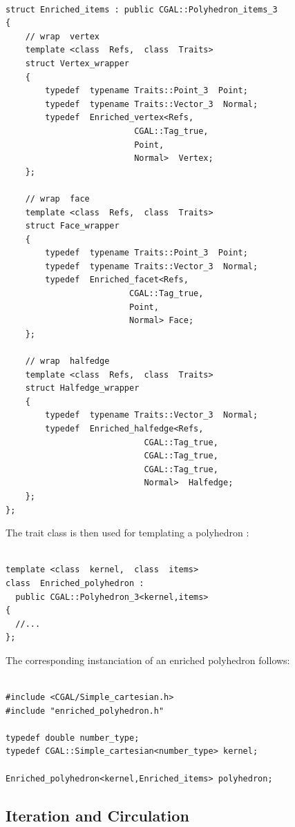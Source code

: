 \documentclass[letter,twoside,10pt]{article}
\begin{document}
{ \scriptsize
\begin{verbatim}

struct Enriched_items : public CGAL::Polyhedron_items_3
{
    // wrap  vertex
    template <class  Refs,  class  Traits>
    struct Vertex_wrapper
    {
        typedef  typename Traits::Point_3  Point;
        typedef  typename Traits::Vector_3  Normal;
        typedef  Enriched_vertex<Refs,
                          CGAL::Tag_true,
                          Point,
                          Normal>  Vertex;
    };

    // wrap  face
    template <class  Refs,  class  Traits>
    struct Face_wrapper
    {
        typedef  typename Traits::Point_3  Point;
        typedef  typename Traits::Vector_3  Normal;
        typedef  Enriched_facet<Refs,
                         CGAL::Tag_true,
                         Point,
                         Normal> Face;
    };

    // wrap  halfedge
    template <class  Refs,  class  Traits>
    struct Halfedge_wrapper
    {
        typedef  typename Traits::Vector_3  Normal;
        typedef  Enriched_halfedge<Refs,
                            CGAL::Tag_true,
                            CGAL::Tag_true,
                            CGAL::Tag_true,
                            Normal>  Halfedge;
    };
};
\end{verbatim}}

The trait class is then used for templating a polyhedron
:

{ \scriptsize
\begin{verbatim}

template <class  kernel,  class  items>
class  Enriched_polyhedron :
  public CGAL::Polyhedron_3<kernel,items>
{
  //...
};
\end{verbatim}}

The corresponding instanciation of an enriched polyhedron follows:

{ \scriptsize
\begin{verbatim}

#include <CGAL/Simple_cartesian.h>
#include "enriched_polyhedron.h"

typedef double number_type;
typedef CGAL::Simple_cartesian<number_type> kernel;

Enriched_polyhedron<kernel,Enriched_items> polyhedron;

\end{verbatim}}



\subsection{Iteration and Circulation}
\end{document}
